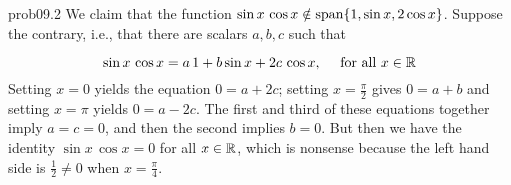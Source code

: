 \begin{sol}{prob09.2}
We claim that the function $\sin x \, \cos x \notin \textrm{span}\{1, \sin x, 2 \cos x\}$. Suppose the contrary, i.e., that there are scalars $a,b,c$ such that 

$$ \sin x \, \cos x= a\,1 + b \sin x + 2c\, \cos x, \quad \text{ for all } x\in \mathbb{R}$$Setting $x=0$ yields the equation $0=a+2c$; setting $x=\frac{\pi}{2}$ gives $0=a+b$ and setting $x=  \pi $ yields $0=a-2c$. The first and third of these equations together imply $a=c=0$, and then the second implies $b=0$. But then we have the identity $ \sin x \, \cos x =0$ for all $x\in \mathbb{R}$, which is nonsense because the left hand side is $\frac12\not=0$ when $x=\frac{\pi}4$.









\end{sol}

